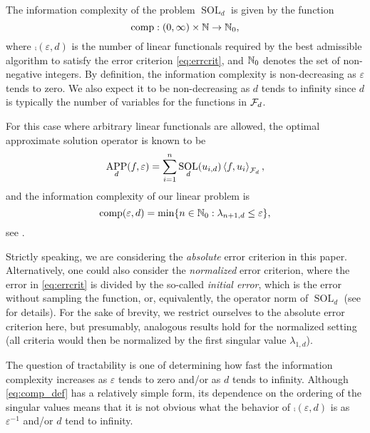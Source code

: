 \documentclass[sort&compress]{elsarticle}
\DeclareMathOperator{\SOL}{SOL}
\DeclareMathOperator{\APP}{APP}
\begin{document}
The information complexity of the problem $\SOL_d$ is given by the function 
\[
\operatorname{comp}:(0,\infty) \times \mathbb{N} \to \mathbb{N}_{0}, 
\]
where $\comp(\varepsilon,d)$ is the number of linear functionals required by the best admissible algorithm to satisfy the error criterion \eqref{eq:errcrit}, and  $\mathbb{N}_0$ denotes the set of non-negative integers.
By definition, the information complexity is non-decreasing as $\varepsilon$ tends to zero.  We also expect it to be non-decreasing as $d$ tends to infinity since $d$ is typically the number of variables for the functions in $\mathcal{F}_d$.

For this case where arbitrary linear functionals are allowed, the optimal approximate solution operator is known to be
\[
\APP_d(f,\varepsilon) = \sum_{i=1}^n \SOL_d(u_{i,d}) \ip[\cf_d]{f}{u_i},
\]
and the information complexity of our linear problem is
\begin{equation}\label{eq:comp_def}
\operatorname{comp}(\varepsilon, d) = \min \{n \in \mathbb{N}_{0} : \lambda_{n+1, d} \le \varepsilon\},
\end{equation}
see \cite{NovWoz08a}.

Strictly speaking, we are considering the \textit{absolute} error criterion in this paper.
Alternatively, one could also consider the \textit{normalized} error criterion, where the error in \eqref{eq:errcrit} is divided by the so-called \textit{initial error}, which is the error without sampling the function, or, equivalently, the operator norm of $\SOL_d$ (see \cite{NovWoz08a} for details). For the sake of brevity, we restrict ourselves to the absolute error criterion here, but presumably, analogous results hold for the normalized setting (all criteria would then be normalized by the first singular value $\lambda_{1,d}$).

The question of tractability is one of determining how fast the information complexity increases as $\varepsilon$ tends to zero and/or as $d$ tends to infinity.  Although \eqref{eq:comp_def} has a relatively simple form, its dependence on the ordering of the singular values means that it is not obvious what the behavior of $\comp(\varepsilon, d)$ is as $\varepsilon^{-1}$ and/or $d$ tend to infinity.
\end{document}
